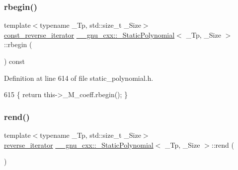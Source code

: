 \subsubsection{\texorpdfstring{rbegin()}{rbegin()}\hspace{0.1cm}{\footnotesize\ttfamily [2/2]}}
{\footnotesize\ttfamily template$<$typename \+\_\+\+Tp, std\+::size\+\_\+t \+\_\+\+Size$>$ \\
\hyperlink{class____gnu__cxx_1_1__StaticPolynomial_ae59b7bc5bdf7c61e562e8c4c8eaf904d}{const\+\_\+reverse\+\_\+iterator} \hyperlink{class____gnu__cxx_1_1__StaticPolynomial}{\+\_\+\+\_\+gnu\+\_\+cxx\+::\+\_\+\+Static\+Polynomial}$<$ \+\_\+\+Tp, \+\_\+\+Size $>$\+::rbegin (\begin{DoxyParamCaption}{ }\end{DoxyParamCaption}) const\hspace{0.3cm}{\ttfamily [inline]}}



Definition at line 614 of file static\+\_\+polynomial.\+h.


\begin{DoxyCode}
615       \{ \textcolor{keywordflow}{return} this->\_M\_coeff.rbegin(); \}
\end{DoxyCode}
\mbox{\label{class____gnu__cxx_1_1__StaticPolynomial_a5f3ae3de860401093c3bbf768218db70}} 
\subsubsection{\texorpdfstring{rend()}{rend()}\hspace{0.1cm}{\footnotesize\ttfamily [1/2]}}
{\footnotesize\ttfamily template$<$typename \+\_\+\+Tp, std\+::size\+\_\+t \+\_\+\+Size$>$ \\
\hyperlink{class____gnu__cxx_1_1__StaticPolynomial_a6313ff2d9e03c7911016595440c6a2ae}{reverse\+\_\+iterator} \hyperlink{class____gnu__cxx_1_1__StaticPolynomial}{\+\_\+\+\_\+gnu\+\_\+cxx\+::\+\_\+\+Static\+Polynomial}$<$ \+\_\+\+Tp, \+\_\+\+Size $>$\+::rend (\begin{DoxyParamCaption}{ }\end{DoxyParamCaption})\hspace{0.3cm}{\ttfamily [inline]}}



